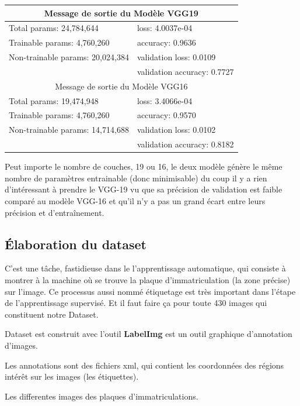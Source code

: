	\begin{table}[H]
		\centering
		\begin{tabular}{p{6cm}|p{6cm}}\hline
			\multicolumn{2}{c}{Message de sortie du Modèle VGG19}\\
			\hline
			Total params: 24,784,644 & loss: 4.0037e-04 \\
			Trainable params: 4,760,260 & accuracy: 0.9636 \\
			Non-trainable params: 20,024,384 & validation loss: 0.0109 \\
			& validation accuracy: 0.7727 \\
			\hline
			\multicolumn{2}{c}{Message de sortie du Modèle VGG16}\\
			\hline
			
			Total params: 19,474,948 & loss: 3.4066e-04 \\
			Trainable params: 4,760,260 & accuracy: 0.9570 \\
			Non-trainable params: 14,714,688 & validation loss: 0.0102 \\
			& validation accuracy: 0.8182 \\
			\hline
		\end{tabular}
	\end{table}

	Peut importe le nombre de couches, 19 ou 16, le deux modèle génère le même nombre de paramètres entrainable (donc minimisable) du coup il y a rien d'intéressant à prendre le VGG-19 vu que sa précision de validation est faible comparé au modèle VGG-16 et qu’il n’y a pas un grand écart entre leurs précision et d'entraînement.
	
	\subsection{Élaboration du dataset}
	C'est une tâche, fastidieuse dans le l'apprentissage automatique, qui consiste à montrer à la machine où se trouve la plaque d'immatriculation (la zone précise) sur l'image. Ce processus aussi nommé étiquetage est très important dans l'étape de l'apprentissage supervisé. Et il faut faire ça pour toute 430 images qui constituent notre Dataset.
	
	Dataset est construit avec l’outil \textbf{LabelImg} est un outil graphique d'annotation d'images.
	\begin{list}{--}{Le Dataset est un répertoire composé des sous répertoire qui contient :}
		\item Les annotations sont des fichiers xml, qui contient les coordonnées des régions intérêt sur les images (les étiquettes).
		\item Les differentes images des plaques d'immatriculations. 
	\end{list}
	

